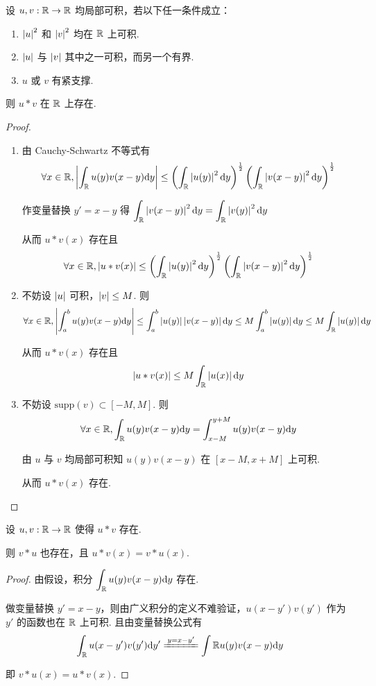 \begin{property}
    设 $u,v:\mathbb{R}\to\mathbb{R}$ 均局部可积，若以下任一条件成立：

    \begin{enumerate}
        \item $\left\lvert{u}\right\rvert^2$ 和 $\left\lvert{v}\right\rvert^2$ 均在 $\mathbb{R}$ 上可积.
        
        \item $\left\lvert{u}\right\rvert$ 与 $\left\lvert{v}\right\rvert$ 其中之一可积，而另一个有界.
        
        \item $u$ 或 $v$ 有紧支撑.
    \end{enumerate}

    则 $u*v$ 在 $\mathbb{R}$ 上存在.
\end{property}
\begin{proof}
    \begin{enumerate}
        \item 由 Cauchy-Schwartz 不等式有
$$
\forall x\in\mathbb{R},\left\lvert{\int_{\mathbb{R}}u(y)v(x-y)\mathrm{d}y}\right\rvert\le\left(\int_{\mathbb{R}}\left\lvert{u(y)}\right\rvert^2\mathrm{d} y\right)^\frac{1}{2}\left(\int_{\mathbb{R}}\left\lvert{v(x-y)}\right\rvert^2\mathrm{d} y\right)^\frac{1}{2}
$$

        作变量替换 $y'=x-y$ 得 $\displaystyle\int_{\mathbb{R}}\left\lvert{v(x-y)}\right\rvert^2\mathrm{d} y=\int_{\mathbb{R}}\left\lvert{v(y)}\right\rvert^2\mathrm{d} y$

        从而 $u*v(x)$ 存在且
$$
\forall x\in\mathbb{R},\left\lvert{u*v(x)}\right\rvert\le\left(\int_{\mathbb{R}}\left\lvert{u(y)}\right\rvert^2\mathrm{d} y\right)^\frac{1}{2}\left(\int_{\mathbb{R}}\left\lvert{v(x-y)}\right\rvert^2\mathrm{d} y\right)^\frac{1}{2}
$$

        \item 不妨设 $\left\lvert{u}\right\rvert$ 可积，$\left\lvert{v}\right\rvert\le M$. 则
$$
\forall x\in\mathbb{R},\left\lvert{\int_a^b u(y)v(x-y)\mathrm{d}y}\right\rvert\le\int_a^b\left\lvert{u(y)}\right\rvert\left\lvert{v(x-y)}\right\rvert\mathrm{d} y\le M\int_a^b\left\lvert{u(y)}\right\rvert\mathrm{d} y\le M\int_{\mathbb{R}}\left\lvert{u(y)}\right\rvert\mathrm{d} y
$$

        从而 $u*v(x)$ 存在且
$$
\left\lvert{u*v(x)}\right\rvert\le M\int_{\mathbb{R}}\left\lvert{u(x)}\right\rvert\mathrm{d} y
$$

        \item 不妨设 $\mathrm{supp}(v)\subset[-M,M]$. 则
$$
\forall x\in\mathbb{R},\int_{\mathbb{R}} u(y)v(x-y)\mathrm{d} y=\int_{x-M}^{y+M}u(y)v(x-y)\mathrm{d} y
$$

        由 $u$ 与 $v$ 均局部可积知 $u(y)v(x-y)$ 在 $[x-M,x+M]$ 上可积.

        从而 $u*v(x)$ 存在.
    \end{enumerate}
\end{proof}



\begin{property}
    设 $u,v:\mathbb{R}\to\mathbb{R}$ 使得 $u*v$ 存在.

    则 $v*u$ 也存在，且 $u*v(x)=v*u(x)$.
\end{property}
\begin{proof}
    由假设，积分 $\displaystyle\int_{\mathbb{R}} u(y)v(x-y)\mathrm{d} y$ 存在.

    做变量替换 $y'=x-y$，则由广义积分的定义不难验证，$u(x-y')v(y')$ 作为 $y'$ 的函数也在 $\mathbb{R}$ 上可积. 且由变量替换公式有
$$
\int_\RR u(x-y')v(y')\dd y'\xlongequal{y=x-y'}\int\RR u(y)v(x-y)\dd y
$$

    即 $v*u(x)=u*v(x)$.
\end{proof}

